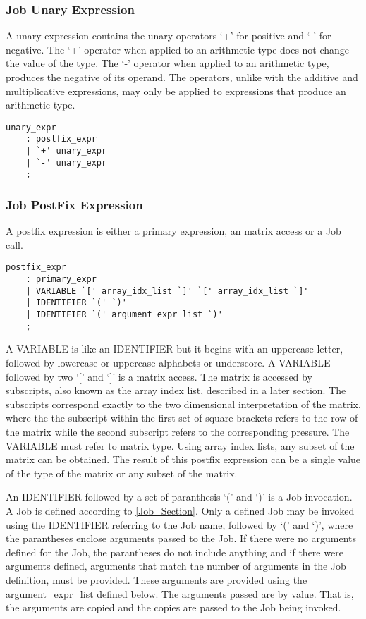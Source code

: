 \documentclass[prodmode,acmtecs]{acmsmall}
\begin{document}
\subsubsection{Job Unary Expression}
  
A unary expression contains the unary operators `+' for positive and `-' 
for negative. The `+' operator when applied to an arithmetic type does
not change the value of the type. The `-' operator when applied to an
arithmetic type, produces the negative of its operand. The operators, 
unlike with the additive and multiplicative expressions, may only be
applied to expressions that produce an arithmetic type.


\begin{lstlisting}
unary_expr
	: postfix_expr
	| `+' unary_expr
	| `-' unary_expr
	;
\end{lstlisting}

\subsubsection{Job PostFix Expression}

A postfix expression is either a primary expression, an matrix access or 
a Job call.

\begin{lstlisting}
postfix_expr
	: primary_expr
	| VARIABLE `[' array_idx_list `]' `[' array_idx_list `]'
	| IDENTIFIER `(' `)'
	| IDENTIFIER `(' argument_expr_list `)'
	;
\end{lstlisting}

A VARIABLE is like an IDENTIFIER but it begins with an uppercase letter,
followed by lowercase or uppercase alphabets or underscore. A VARIABLE
followed by two `[' and `]' is a matrix access. The matrix is accessed
by subscripts, also known as the array index list, described in a later
section. The subscripts correspond exactly to the two dimensional 
interpretation of the matrix, where the the subscript within the first 
set of square brackets refers to the row of the matrix while the second
subscript refers to the corresponding pressure. The VARIABLE must refer 
to matrix type. Using array index lists, any subset of the matrix can be
obtained. The result of this postfix expression can be a single value of
the type of the matrix or any subset of the matrix.

An IDENTIFIER followed by a set of paranthesis `(' and `)' is a Job
invocation. A Job is defined according to \ref{Job_Section}. Only a defined
Job may be invoked using the IDENTIFIER referring to the Job name,
followed by `(' and `)', where the parantheses enclose arguments passed
to the Job. If there were no arguments defined for the Job, the
parantheses do not include anything and if there were arguments defined, 
arguments that match the number of arguments in the Job definition, must
be provided. These arguments are provided using the argument\_expr\_list 
defined below. The arguments passed are by value. That is, the arguments 
are copied and the copies are passed to the Job being invoked.
\end{document}
